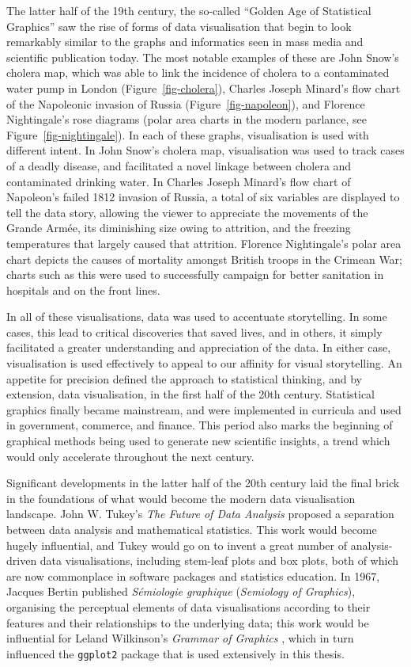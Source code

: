 \documentclass[../main.tex]{subfiles}
\begin{document}
The latter half of the 19th century, the so-called ``Golden Age of
Statistical Graphics'' \cite{friendly_2008b} saw the rise of forms of
data visualisation that begin to look remarkably similar to the graphs
and informatics seen in mass media and scientific publication today. The
most notable examples of these are John Snow's cholera map, which was
able to link the incidence of cholera to a contaminated water pump in
London (Figure~\ref{fig-cholera}), Charles Joseph Minard's flow chart of
the Napoleonic invasion of Russia (Figure~\ref{fig-napoleon}), and
Florence Nightingale's rose diagrams (polar area charts in the modern
parlance, see Figure~\ref{fig-nightingale}). In each of these graphs,
visualisation is used with different intent. In John Snow's cholera map,
visualisation was used to track cases of a deadly disease, and
facilitated a novel linkage between cholera and contaminated drinking
water. In Charles Joseph Minard's flow chart of Napoleon's failed 1812
invasion of Russia, a total of six variables are displayed to tell the
data story, allowing the viewer to appreciate the movements of the
Grande Armée, its diminishing size owing to attrition, and the freezing
temperatures that largely caused that attrition. Florence Nightingale's
polar area chart depicts the causes of mortality amongst British troops
in the Crimean War; charts such as this were used to successfully
campaign for better sanitation in hospitals and on the front lines.

In all of these visualisations, data was used to accentuate
storytelling. In some cases, this lead to critical discoveries that
saved lives, and in others, it simply facilitated a greater
understanding and appreciation of the data. In either case,
visualisation is used effectively to appeal to our affinity for visual
storytelling. An appetite for precision defined the approach to
statistical thinking, and by extension, data visualisation, in the first
half of the 20th century. Statistical graphics finally became
mainstream, and were implemented in curricula and used in government,
commerce, and finance. This period also marks the beginning of graphical
methods being used to generate new scientific insights, a trend which
would only accelerate throughout the next century.

Significant developments in the latter half of the 20th century laid the
final brick in the foundations of what would become the modern data
visualisation landscape. John W. Tukey's \emph{The Future of Data
Analysis} \cite{tukey_1962} proposed a separation between data analysis
and mathematical statistics. This work would become hugely influential,
and Tukey would go on to invent a great number of analysis-driven data
visualisations, including stem-leaf plots and box plots, both of which
are now commonplace in software packages and statistics education. In
1967, Jacques Bertin \cite{bertin_1967} published \emph{Sémiologie
graphique} (\emph{Semiology of Graphics}), organising the perceptual
elements of data visualisations according to their features and their
relationships to the underlying data; this work would be influential for
Leland Wilkinson's \emph{Grammar of Graphics} \cite{wilkinson_1999},
which in turn influenced the \texttt{ggplot2} package
\cite{wickham_2016} that is used extensively in this thesis.
\end{document}
